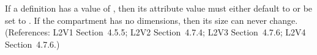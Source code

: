 If a \Compartment definition has a  value of
, then its  attribute value must either default to or be
set to .  If the compartment has no dimensions, then its size can
never change.  (References: L2V1 Section~4.5.5; L2V2 Section~4.7.4; L2V3
Section~4.7.6; L2V4 Section~4.7.6.)
